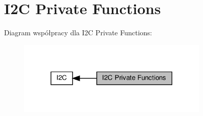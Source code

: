 \hypertarget{group___i2_c___private___functions}{}\section{I2C Private Functions}
\label{group___i2_c___private___functions}
Diagram współpracy dla I2C Private Functions\+:\nopagebreak
\begin{figure}[H]
\begin{center}
\leavevmode
\includegraphics[width=260pt]{group___i2_c___private___functions}
\end{center}
\end{figure}
